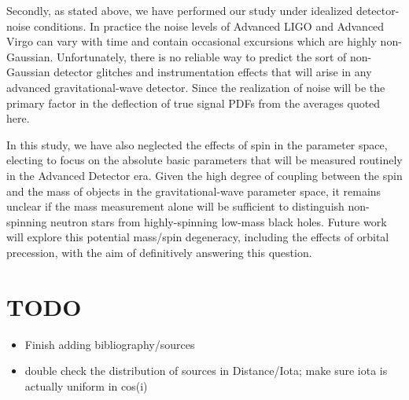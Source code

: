 \documentclass[11pt,a4paper]{emulateapj}
\newcommand{\carl}[1]{{\color{red}  #1}}
\begin{document}
Secondly, as stated above, we have performed our study under idealized detector-noise conditions.  In practice the noise levels of Advanced LIGO and Advanced Virgo can vary with time and contain occasional excursions which are highly non-Gaussian.  Unfortunately, there is no reliable way to predict the sort of non-Gaussian detector glitches and instrumentation effects that will arise in any advanced gravitational-wave detector.  Since the realization of noise will be the primary factor in the deflection of true signal PDFs from the averages quoted here.

In this study, we have also neglected the effects of spin in the parameter space, electing to focus on the absolute basic
 parameters that will be measured routinely in the Advanced Detector era.  Given the high degree of coupling
between the spin and the mass of objects in the gravitational-wave parameter space, it remains unclear
if the mass measurement alone will be sufficient to distinguish non-spinning neutron stars from highly-spinning low-mass
black holes.  Future work will explore this potential mass/spin degeneracy, including the effects of orbital precession, with the aim of definitively answering this question.  

\carl{
\section{TODO}
 \begin{itemize}
 \item Finish adding bibliography/sources
 \item double check the distribution of sources in Distance/Iota; make sure iota is actually uniform in cos(i)
 \end{itemize}
 }


{}
\end{document}
